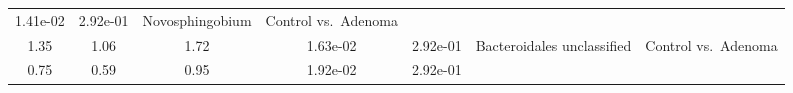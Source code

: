 \documentclass[12pt,]{article}
\begin{document}
\begin{longtable}[]{@{}ccccccc@{}}
\begin{minipage}[t]{0.08\columnwidth}
1.41e-02\strut
\end{minipage} & \begin{minipage}[t]{0.08\columnwidth}\centering\strut
2.92e-01\strut
\end{minipage} & \begin{minipage}[t]{0.23\columnwidth}\centering\strut
Novosphingobium\strut
\end{minipage} & \begin{minipage}[t]{0.16\columnwidth}\centering\strut
Control vs.~Adenoma\strut
\end{minipage}\tabularnewline
\begin{minipage}[t]{0.06\columnwidth}\centering\strut
1.35\strut
\end{minipage} & \begin{minipage}[t]{0.10\columnwidth}\centering\strut
1.06\strut
\end{minipage} & \begin{minipage}[t]{0.10\columnwidth}\centering\strut
1.72\strut
\end{minipage} & \begin{minipage}[t]{0.08\columnwidth}\centering\strut
1.63e-02\strut
\end{minipage} & \begin{minipage}[t]{0.08\columnwidth}\centering\strut
2.92e-01\strut
\end{minipage} & \begin{minipage}[t]{0.23\columnwidth}\centering\strut
Bacteroidales unclassified\strut
\end{minipage} & \begin{minipage}[t]{0.16\columnwidth}\centering\strut
Control vs.~Adenoma\strut
\end{minipage}\tabularnewline
\begin{minipage}[t]{0.06\columnwidth}\centering\strut
0.75\strut
\end{minipage} & \begin{minipage}[t]{0.10\columnwidth}\centering\strut
0.59\strut
\end{minipage} & \begin{minipage}[t]{0.10\columnwidth}\centering\strut
0.95\strut
\end{minipage} & \begin{minipage}[t]{0.08\columnwidth}\centering\strut
1.92e-02\strut
\end{minipage} & \begin{minipage}[t]{0.08\columnwidth}\centering\strut
2.92e-01\strut
\end{minipage} & \begin{minipage}[t]{0.23\columnwidth}\centering\strut

\end{minipage}
\end{longtable}
\end{document}
